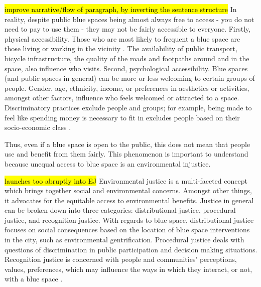 \documentclass{article}
\begin{document}
\hl{improve narrative/flow of paragraph, by inverting the sentence structure}
In reality, despite public blue spaces being almost always free to access - you do not need to pay to use them - they may not be fairly accessible to everyone. 
Firstly, physical accessibility. Those who are most likely to frequent a blue space are those living or working in the vicinity \parencite{???}. The availability of public transport, bicycle infrastructure, the quality of the roads and footpaths around and in the space, also influence who visits.
Second, psychological accessibility. Blue spaces (and public spaces in general) can be more or less welcoming to certain groups of people. Gender, age, ethnicity, income, or preferences in aesthetics or activities, amongst other factors, influence who feels welcomed or attracted to a space. Discriminatory practices exclude people and groups; for example, being made to feel like spending money is necessary to fit in excludes people based on their socio-economic class \parencite{wessells2014urban}.

Thus, even if a blue space is open to the public, this does not mean that people use and benefit from them fairly. 
This phenomenon is important to understand because unequal access to blue space is an environmental injustice.

\hl{launches too abruptly into EJ}
Environmental justice is a multi-faceted concept which brings together social and environmental concerns. Amongst other things, it advocates for the equitable access to environmental benefits. %
Justice in general can be broken down into three categories: distributional justice, procedural justice, and recognition justice. 
With regards to blue space, distributional justice focuses on social consequences based on the location of blue space interventions in the city, such as environmental gentrification.
Procedural justice deals with questions of discrimination in public participation and decision making situations.
Recognition justice is concerned with people and communities' perceptions, values, preferences, which may influence the ways in which they interact, or not, with a blue space \parencite{anguelovski2020expanding}.
\end{document}
